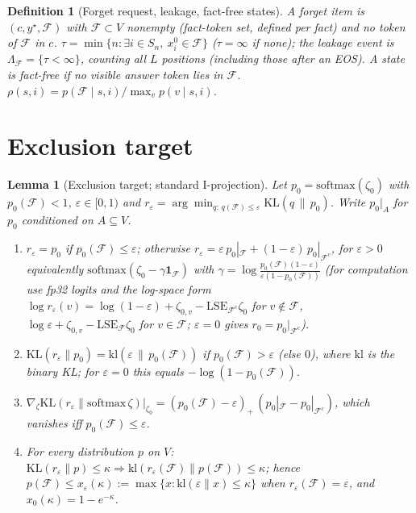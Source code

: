 \documentclass[11pt]{article}
\newtheorem{lemma}{Lemma}
\newtheorem{definition}{Definition}
\newcommand{\F}{\mathcal{F}}
\newcommand{\KL}{\mathrm{KL}}
\begin{document}
\begin{definition}[Forget request, leakage, fact-free states]
A forget item is $(c,y^\star,\F)$ with $\F\subset V$ nonempty (fact-token set, defined per fact) and no token of $\F$ in $c$.
$\tau=\min\{n: \exists i\in S_n,\ x^0_i\in\F\}$ ($\tau=\infty$ if none); the leakage event is $\Lambda_\F=\{\tau<\infty\}$,
counting all $L$ positions (including those after an EOS). A state is \emph{fact-free} if no visible answer token lies in $\F$.
$\rho(s,i)=p(\F\mid s,i)/\max_{v}p(v\mid s,i)$.
\end{definition}

\section{Exclusion target}
\begin{lemma}[Exclusion target; standard I-projection]\label{lem:T}
Let $p_0=\mathrm{softmax}(\zeta_0)$ with $p_0(\F)<1$, $\varepsilon\in[0,1)$ and
$r_\varepsilon=\arg\min_{q:\,q(\F)\le\varepsilon}\KL(q\,\|\,p_0)$. Write $p_0|_A$ for $p_0$ conditioned on $A\subseteq V$.
\begin{enumerate}
\item[(i)] $r_\varepsilon=p_0$ if $p_0(\F)\le\varepsilon$; otherwise $r_\varepsilon=\varepsilon\,p_0|_\F+(1-\varepsilon)\,p_0|_{\F^c}$,
for $\varepsilon>0$ equivalently $\mathrm{softmax}(\zeta_0-\gamma\mathbf{1}_\F)$ with $\gamma=\log\frac{p_0(\F)(1-\varepsilon)}{\varepsilon(1-p_0(\F))}$
(for computation use fp32 logits and the log-space form $\log r_\varepsilon(v)=\log(1-\varepsilon)+\zeta_{0,v}-\mathrm{LSE}_{\F^c}\zeta_0$ for $v\notin\F$,
$\log\varepsilon+\zeta_{0,v}-\mathrm{LSE}_{\F}\zeta_0$ for $v\in\F$; $\varepsilon=0$ gives $r_0=p_0|_{\F^c}$).
\item[(ii)] $\KL(r_\varepsilon\|p_0)=\mathrm{kl}(\varepsilon\,\|\,p_0(\F))$ if $p_0(\F)>\varepsilon$ (else $0$), where
$\mathrm{kl}$ is the binary KL; for $\varepsilon=0$ this equals $-\log(1-p_0(\F))$.
\item[(iii)] $\nabla_\zeta \KL(r_\varepsilon\|\mathrm{softmax}\,\zeta)\big|_{\zeta_0}=(p_0(\F)-\varepsilon)_+\,(p_0|_\F-p_0|_{\F^c})$,
which vanishes iff $p_0(\F)\le\varepsilon$.
\item[(iv)] For every distribution $p$ on $V$: $\KL(r_\varepsilon\|p)\le\kappa\Rightarrow \mathrm{kl}(r_\varepsilon(\F)\|p(\F))\le\kappa$; hence
$p(\F)\le x_\varepsilon(\kappa):=\max\{x:\mathrm{kl}(\varepsilon\|x)\le\kappa\}$ when $r_\varepsilon(\F)=\varepsilon$, and $x_0(\kappa)=1-e^{-\kappa}$.
\end{enumerate}
\end{lemma}
\end{document}
